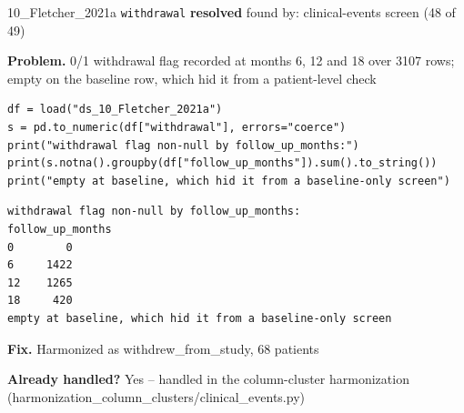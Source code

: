 \documentclass[9pt, t, handout]{beamer}
\newcommand{\ans}[1]{\textcolor{structure.fg}{#1}}
\begin{document}
\begin{frame}[fragile]{10\_Fletcher\_2021a \quad \texttt{withdrawal}}
  {\scriptsize\textcolor{green!45!black}{\textbf{resolved}} \quad
   found by: clinical-events screen \quad (48 of 49)}
  \vspace{3pt}

  {\footnotesize \textbf{Problem.} 0/1 withdrawal flag recorded at months 6, 12 and 18 over 3107 rows; empty on the baseline row, which hid it from a patient-level check}
  \vspace{4pt}

  \begin{Verbatim}[fontsize=\tiny, frame=single, framesep=2pt, label=\tiny reproduce]
df = load("ds_10_Fletcher_2021a")
s = pd.to_numeric(df["withdrawal"], errors="coerce")
print("withdrawal flag non-null by follow_up_months:")
print(s.notna().groupby(df["follow_up_months"]).sum().to_string())
print("empty at baseline, which hid it from a baseline-only screen")
  \end{Verbatim}
  \begin{Verbatim}[fontsize=\tiny, frame=single, framesep=2pt, label=\tiny output]
withdrawal flag non-null by follow_up_months:
follow_up_months
0        0
6     1422
12    1265
18     420
empty at baseline, which hid it from a baseline-only screen
  \end{Verbatim}
  \vspace{2pt}

  {\footnotesize \textbf{Fix.} Harmonized as withdrew\_from\_study, 68 patients}
  \vspace{2pt}

  {\footnotesize \textbf{Already handled?} \ans{Yes} -- handled in the column-cluster harmonization
   (harmonization\_column\_clusters/clinical\_events.py)}
\end{frame}
\end{document}
